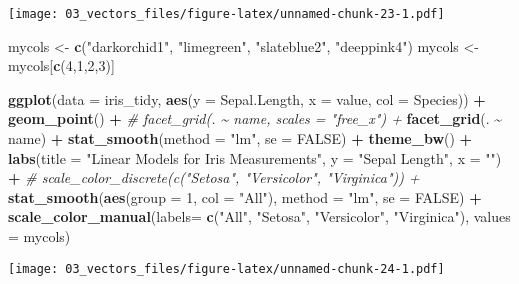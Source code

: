 \documentclass[
]{article}
\newenvironment{Shaded}{\begin{snugshade}}{\end{snugshade}}
\newcommand{\CommentTok}[1]{\textcolor[rgb]{0.56,0.35,0.01}{\textit{#1}}}
\newcommand{\DataTypeTok}[1]{\textcolor[rgb]{0.13,0.29,0.53}{#1}}
\newcommand{\DecValTok}[1]{\textcolor[rgb]{0.00,0.00,0.81}{#1}}
\newcommand{\KeywordTok}[1]{\textcolor[rgb]{0.13,0.29,0.53}{\textbf{#1}}}
\newcommand{\NormalTok}[1]{#1}
\newcommand{\OperatorTok}[1]{\textcolor[rgb]{0.81,0.36,0.00}{\textbf{#1}}}
\newcommand{\OtherTok}[1]{\textcolor[rgb]{0.56,0.35,0.01}{#1}}
\newcommand{\StringTok}[1]{\textcolor[rgb]{0.31,0.60,0.02}{#1}}
\begin{document}
\texttt{[image: 03\_vectors\_files/figure-latex/unnamed-chunk-23-1.pdf]}

\begin{Shaded}
\begin{Highlighting}[]
\NormalTok{mycols <{-}}\StringTok{ }\KeywordTok{c}\NormalTok{(}\StringTok{"darkorchid1"}\NormalTok{, }\StringTok{"limegreen"}\NormalTok{, }\StringTok{"slateblue2"}\NormalTok{, }\StringTok{"deeppink4"}\NormalTok{)}
\NormalTok{mycols <{-}}\StringTok{ }\NormalTok{mycols[}\KeywordTok{c}\NormalTok{(}\DecValTok{4}\NormalTok{,}\DecValTok{1}\NormalTok{,}\DecValTok{2}\NormalTok{,}\DecValTok{3}\NormalTok{)]}


\KeywordTok{ggplot}\NormalTok{(}\DataTypeTok{data =}\NormalTok{ iris\_tidy, }\KeywordTok{aes}\NormalTok{(}\DataTypeTok{y =}\NormalTok{ Sepal.Length, }\DataTypeTok{x =}\NormalTok{ value, }\DataTypeTok{col =}\NormalTok{ Species)) }\OperatorTok{+}
\StringTok{  }\KeywordTok{geom\_point}\NormalTok{() }\OperatorTok{+}\StringTok{ }
\CommentTok{\#  facet\_grid(. \textasciitilde{} name, scales = "free\_x") +}
\StringTok{  }\KeywordTok{facet\_grid}\NormalTok{(. }\OperatorTok{\textasciitilde{}}\StringTok{ }\NormalTok{name) }\OperatorTok{+}
\StringTok{  }\KeywordTok{stat\_smooth}\NormalTok{(}\DataTypeTok{method =} \StringTok{"lm"}\NormalTok{, }\DataTypeTok{se =} \OtherTok{FALSE}\NormalTok{) }\OperatorTok{+}
\StringTok{  }\KeywordTok{theme\_bw}\NormalTok{() }\OperatorTok{+}
\StringTok{  }\KeywordTok{labs}\NormalTok{(}\DataTypeTok{title =} \StringTok{"Linear Models for Iris Measurements"}\NormalTok{, }\DataTypeTok{y =} \StringTok{"Sepal Length"}\NormalTok{, }\DataTypeTok{x =} \StringTok{""}\NormalTok{) }\OperatorTok{+}
\CommentTok{\#  scale\_color\_discrete(c("Setosa", "Versicolor", "Virginica")) +}
\StringTok{  }\KeywordTok{stat\_smooth}\NormalTok{(}\KeywordTok{aes}\NormalTok{(}\DataTypeTok{group =} \DecValTok{1}\NormalTok{, }\DataTypeTok{col =} \StringTok{"All"}\NormalTok{), }\DataTypeTok{method =} \StringTok{"lm"}\NormalTok{, }\DataTypeTok{se =} \OtherTok{FALSE}\NormalTok{) }\OperatorTok{+}
\StringTok{  }\KeywordTok{scale\_color\_manual}\NormalTok{(}\DataTypeTok{labels=} \KeywordTok{c}\NormalTok{(}\StringTok{"All"}\NormalTok{, }\StringTok{"Setosa"}\NormalTok{, }\StringTok{"Versicolor"}\NormalTok{, }\StringTok{"Virginica"}\NormalTok{),}
                     \DataTypeTok{values =}\NormalTok{ mycols)}
\end{Highlighting}
\end{Shaded}

\texttt{[image: 03\_vectors\_files/figure-latex/unnamed-chunk-24-1.pdf]}
\end{document}
